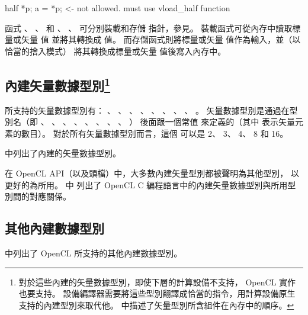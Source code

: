 half *p;
a = *p;		<- not allowed. must use vload_half function
\stopclc

函式 、 、 
和 、 、 
可分別裝載和存儲  指針，參見。
裝載函式可從內存中讀取標量或矢量  值 並將其轉換成  值。
而存儲函式則將標量或矢量  值作為輸入，並（以恰當的捨入模式）
將其轉換成標量或矢量  值後寫入內存中。


\subsection[sec:bivdt]{內建矢量數據型別\footnote{%
對於這些內建的矢量數據型別，即使下層的計算設備不支持， OpenCL 實作也要支持。
設備編譯器需要將這些型別翻譯成恰當的指令，用計算設備原生支持的內建型別來取代他。
中描述了矢量型別所含組件在內存中的順序。}}

所支持的矢量數據型別有：
、 、
、 、
、 、
、 、
。
矢量數據型別是通過在型別名（即
、 、
、 、
、 、
、 、
）
後面跟一個常值  來定義的（其中  表示矢量元素的數目）。
對於所有矢量數據型別而言，這個  可以是 2、 3、 4、 8 和 16。

中列出了內建的矢量數據型別。

{}

在 OpenCL API（以及頭檔）中，大多數內建矢量型別都被聲明為其他型別，
以更好的為所用。
中
列出了 OpenCL C 編程語言中的內建矢量數據型別與所用型別間的對應關係。

{}

\subsection[sec:obidt]{其他內建數據型別}

中列出了 OpenCL 所支持的其他內建數據型別。

